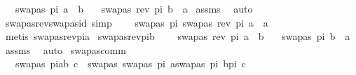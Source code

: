 \begin{isabellebody}
\ \ \ {\isachardoublequoteopen}swapas\ pi\ a\ {\isacharequal}{\kern0pt}\ b{\isachardoublequoteclose}\isanewline
\ \ \ {\isachardoublequoteopen}swapas\ {\isacharparenleft}{\kern0pt}rev\ pi{\isacharparenright}{\kern0pt}\ b\ {\isacharequal}{\kern0pt}\ a{\isachardoublequoteclose}\isanewline
%
\isadelimproof
%
\endisadelimproof
%
\isatagproof
{}\isamarkupfalse%
\ assms\ \isamarkupfalse%
\ auto%
\endisatagproof
{\isafoldproof}%
%
\isadelimproof
\isanewline
%
\endisadelimproof
\isanewline
\isanewline
{}\isamarkupfalse%
\ swapas{\isacharunderscore}{\kern0pt}rev{\isacharunderscore}{\kern0pt}swapas{\isacharunderscore}{\kern0pt}id\ {\isacharbrackleft}{\kern0pt}simp{\isacharbrackright}{\kern0pt}{\isacharcolon}{\kern0pt}\ \isanewline
\ \ \ {\isachardoublequoteopen}swapas\ pi\ {\isacharparenleft}{\kern0pt}swapas\ {\isacharparenleft}{\kern0pt}rev\ pi{\isacharparenright}{\kern0pt}\ a{\isacharparenright}{\kern0pt}\ {\isacharequal}{\kern0pt}\ a{\isachardoublequoteclose}\isanewline
%
\isadelimproof
\ \ %
\endisadelimproof
%
\isatagproof
{}\isamarkupfalse%
\ {\isacharparenleft}{\kern0pt}metis\ swapas{\isacharunderscore}{\kern0pt}rev{\isacharunderscore}{\kern0pt}pi{\isacharunderscore}{\kern0pt}a{\isacharparenright}{\kern0pt}%
\endisatagproof
{\isafoldproof}%
%
\isadelimproof
\isanewline
%
\endisadelimproof
\isanewline
{}\isamarkupfalse%
\ swapas{\isacharunderscore}{\kern0pt}rev{\isacharunderscore}{\kern0pt}pi{\isacharunderscore}{\kern0pt}b{\isacharcolon}{\kern0pt}\ \isanewline
\ \ \ {\isachardoublequoteopen}swapas\ {\isacharparenleft}{\kern0pt}rev\ pi{\isacharparenright}{\kern0pt}\ a\ {\isacharequal}{\kern0pt}\ b{\isachardoublequoteclose}\isanewline
\ \ \ {\isachardoublequoteopen}swapas\ pi\ b\ {\isacharequal}{\kern0pt}\ a{\isachardoublequoteclose}\isanewline
%
\isadelimproof
%
\endisadelimproof
%
\isatagproof
{}\isamarkupfalse%
\ assms\ \isamarkupfalse%
\ auto%
\endisatagproof
{\isafoldproof}%
%
\isadelimproof
\isanewline
%
\endisadelimproof
\isanewline
{}\isamarkupfalse%
\ swapas{\isacharunderscore}{\kern0pt}comm{\isacharcolon}{\kern0pt}\ \isanewline
\ \ \ {\isachardoublequoteopen}{\isacharparenleft}{\kern0pt}swapas\ {\isacharparenleft}{\kern0pt}pi{\isacharat}{\kern0pt}{\isacharbrackleft}{\kern0pt}{\isacharparenleft}{\kern0pt}a{\isacharcomma}{\kern0pt}b{\isacharparenright}{\kern0pt}{\isacharbrackright}{\kern0pt}{\isacharparenright}{\kern0pt}\ c{\isacharparenright}{\kern0pt}\ {\isacharequal}{\kern0pt}\ {\isacharparenleft}{\kern0pt}swapas\ {\isacharparenleft}{\kern0pt}{\isacharbrackleft}{\kern0pt}{\isacharparenleft}{\kern0pt}swapas\ pi\ a{\isacharcomma}{\kern0pt}swapas\ pi\ b{\isacharparenright}{\kern0pt}{\isacharbrackright}{\kern0pt}{\isacharat}{\kern0pt}pi{\isacharparenright}{\kern0pt}\ c{\isacharparenright}{\kern0pt}{\isachardoublequoteclose}\isanewline

\end{isabellebody}
